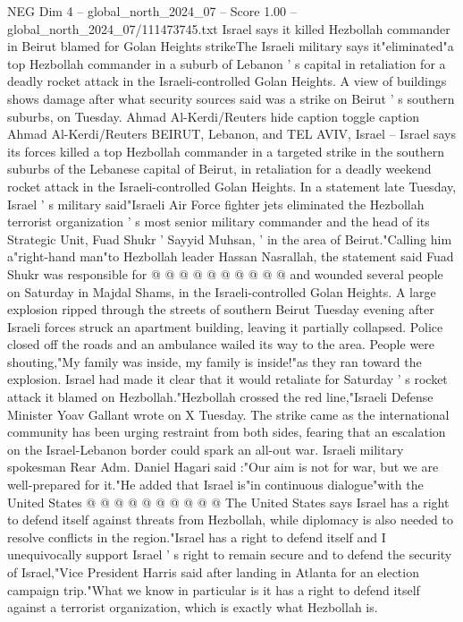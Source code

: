 \begin{textsample}{NEG Dim 4 – global\_north\_2024\_07 – Score 1.00 – global\_north\_2024\_07/111473745.txt}  \label{ex:f4_neg_287}
Israel says it killed Hezbollah commander in Beirut blamed for Golan Heights strikeThe Israeli military says it"eliminated"a top Hezbollah commander in a suburb of Lebanon ' s capital in retaliation for a deadly rocket attack in the Israeli-controlled Golan Heights.
A view of buildings shows damage after what security sources said was a strike on Beirut ' s southern suburbs, on Tuesday.
Ahmad Al-Kerdi/Reuters hide caption toggle caption Ahmad Al-Kerdi/Reuters BEIRUT, Lebanon, and TEL AVIV, Israel -- Israel says its forces killed a top Hezbollah commander in a targeted strike in the southern suburbs of the Lebanese capital of Beirut, in retaliation for a deadly weekend rocket attack in the Israeli-controlled Golan Heights.
In a statement late Tuesday, Israel ' s military said"Israeli Air Force fighter jets eliminated the Hezbollah terrorist organization ' s most senior military commander and the head of its Strategic Unit, Fuad Shukr ' Sayyid Muhsan, ' in the area of Beirut."Calling him a"right-hand man"to Hezbollah leader Hassan Nasrallah, the statement said Fuad Shukr was responsible for @ @ @ @ @ @ @ @ @ @ and wounded several people on Saturday in Majdal Shams, in the Israeli-controlled Golan Heights.
A large explosion ripped through the streets of southern Beirut Tuesday evening after Israeli forces struck an apartment building, leaving it partially collapsed.
Police closed off the roads and an ambulance wailed its way to the area.
People were shouting,"My family was inside, my family is inside!"as they ran toward the explosion.
Israel had made it clear that it would retaliate for Saturday ' s rocket attack it blamed on Hezbollah."Hezbollah crossed the red line,"Israeli Defense Minister Yoav Gallant wrote on X Tuesday.
The strike came as the international community has been urging restraint from both sides, fearing that an escalation on the Israel-Lebanon border could spark an all-out war.
Israeli military spokesman Rear Adm.
Daniel Hagari said :"Our aim is not for war, but we are well-prepared for it."He added that Israel is"in continuous dialogue"with the United States @ @ @ @ @ @ @ @ @ @ The United States says Israel has a right to defend itself against threats from Hezbollah, while diplomacy is also needed to resolve conflicts in the region."Israel has a right to defend itself and I unequivocally support Israel ' s right to remain secure and to defend the security of Israel,"Vice President Harris said after landing in Atlanta for an election campaign trip."What we know in particular is it has a right to defend itself against a terrorist organization, which is exactly what Hezbollah is.

\end{textsample}
